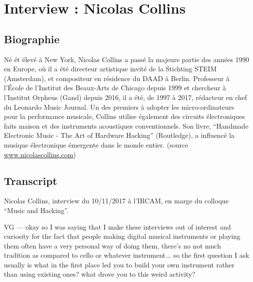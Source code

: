 \chapter{Interview : Nicolas Collins}
\label{appendix:collins}

\section*{Biographie}

\noindent Né ét élevé à New York, Nicolas Collins a passé la majeure partie des années 1990 en Europe, où il a été directeur artistique invité de la Stichting STEIM (Amsterdam), et compositeur en résidence du DAAD à Berlin. Professeur à l'École de l'Institut des Beaux-Arts de Chicago depuis 1999 et chercheur à l'Institut Orpheus (Gand) depuis 2016, il a été, de 1997 à 2017, rédacteur en chef du Leonardo Music Journal. Un des premiers à adopter les micro-ordinateurs pour la performance musicale, Collins utilise également des circuits électroniques faits maison et des instruments acoustiques conventionnels. Son livre, ``Handmade Electronic Music - The Art of Hardware Hacking'' (Routledge), a influencé la musique électronique émergente dans le monde entier. (source \url{www.nicolascollins.com})

\section*{Transcript}

\noindent Nicolas Collins, interview du 10/11/2017 à l'IRCAM, en marge du colloque ``Music and Hacking''.

VG — okay so I was saying that I make these interviews out of interest and curiosity for the fact that people making digital musical instruments or  playing them often have a very personal way of doing them, there's no not much tradition as compared to cello or whatever instrument... so the first question I ask usually is what in the first place led you to build your own instrument rather than using existing ones? what drove you to this weird activity?

